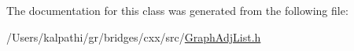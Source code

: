 The documentation for this class was generated from the following file\+:\begin{DoxyCompactItemize}
\item 
/\+Users/kalpathi/gr/bridges/cxx/src/\mbox{\hyperlink{_graph_adj_list_8h}{Graph\+Adj\+List.\+h}}\end{DoxyCompactItemize}

